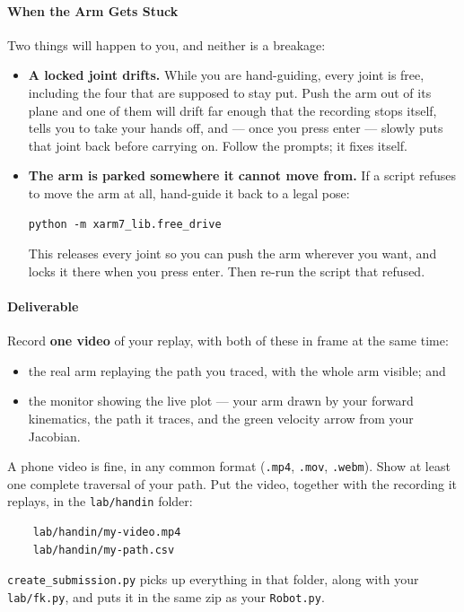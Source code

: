 \documentclass{16384_doc}
\begin{document}
\begin{questions}
    \paragraph{When the Arm Gets Stuck} Two things will happen to you, and
    neither is a breakage:
    \begin{itemize}
      \item \textbf{A locked joint drifts.} While you are hand-guiding, every
            joint is free, including the four that are supposed to stay put.  Push
            the arm out of its plane and one of them will drift far enough that
            the recording stops itself, tells you to take your hands off, and ---
            once you press enter --- slowly puts that joint back before carrying
            on.  Follow the prompts; it fixes itself.
      \item \textbf{The arm is parked somewhere it cannot move from.} If a script
            refuses to move the arm at all, hand-guide it back to a legal pose:
            \begin{verbatim}
python -m xarm7_lib.free_drive
            \end{verbatim}
            This releases every joint so you can push the arm wherever you want,
            and locks it there when you press enter.  Then re-run the script that
            refused.
    \end{itemize}

    \paragraph{Deliverable} Record \textbf{one video} of your replay, with both
    of these in frame at the same time:
    \begin{itemize}
      \item the real arm replaying the path you traced, with the whole arm
            visible; and
      \item the monitor showing the live plot --- your arm
            drawn by your forward kinematics, the path it traces, and the green
            velocity arrow from your Jacobian.
    \end{itemize}
    A phone video is fine, in any common format (\verb!.mp4!, \verb!.mov!,
    \verb!.webm!).  Show at least one complete traversal of your path.  Put the
    video, together with the recording it replays, in the \verb!lab/handin!
    folder:
    \begin{verbatim}
    lab/handin/my-video.mp4
    lab/handin/my-path.csv
\end{verbatim}
    \verb!create_submission.py! picks up everything in that folder, along with
    your \verb!lab/fk.py!, and puts it in the same zip as your \verb!Robot.py!.

\end{questions}
\end{document}
